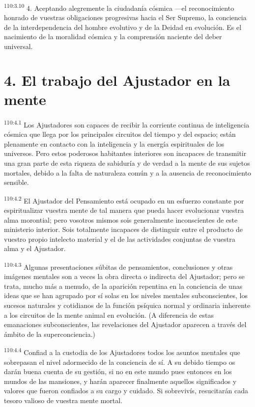 \documentclass[twoside, 11pt]{book}
\begin{document}
\par
\textsuperscript{110:3.10} 4. Aceptando alegremente la ciudadanía cósmica ---el reconocimiento honrado de vuestras obligaciones progresivas hacia el Ser Supremo, la conciencia de la interdependencia del hombre evolutivo y de la Deidad en evolución. Es el nacimiento de la moralidad cósmica y la comprensión naciente del deber universal.

\section*{4. El trabajo del Ajustador en la mente}
\par
\textsuperscript{110:4.1} Los Ajustadores son capaces de recibir la corriente continua de inteligencia cósmica que llega por los principales circuitos del tiempo y del espacio; están plenamente en contacto con la inteligencia y la energía espirituales de los universos. Pero estos poderosos habitantes interiores son incapaces de transmitir una gran parte de esta riqueza de sabiduría y de verdad a la mente de sus sujetos mortales, debido a la falta de naturaleza común y a la ausencia de reconocimiento sensible.

\par
\textsuperscript{110:4.2} El Ajustador del Pensamiento está ocupado en un esfuerzo constante por espiritualizar vuestra mente de tal manera que pueda hacer evolucionar vuestra alma morontial; pero vosotros mismos sois generalmente inconscientes de este ministerio interior. Sois totalmente incapaces de distinguir entre el producto de vuestro propio intelecto material y el de las actividades conjuntas de vuestra alma y el Ajustador.

\par
\textsuperscript{110:4.3} Algunas presentaciones súbitas de pensamientos, conclusiones y otras imágenes mentales son a veces la obra directa o indirecta del Ajustador; pero se trata, mucho más a menudo, de la aparición repentina en la conciencia de unas ideas que se han agrupado por sí solas en los niveles mentales subconscientes, los sucesos naturales y cotidianos de la función psíquica normal y ordinaria inherente a los circuitos de la mente animal en evolución. (A diferencia de estas emanaciones subconscientes, las revelaciones del Ajustador aparecen a través del ámbito de la superconciencia.)

\par
\textsuperscript{110:4.4} Confiad a la custodia de los Ajustadores todos los asuntos mentales que sobrepasan el nivel adormecido de la conciencia de sí. A su debido tiempo os darán buena cuenta de su gestión, si no en este mundo pues entonces en los mundos de las mansiones, y harán aparecer finalmente aquellos significados y valores que fueron confiados a su cargo y cuidado. Si sobrevivís, resucitarán cada tesoro valioso de vuestra mente mortal.
\end{document}
